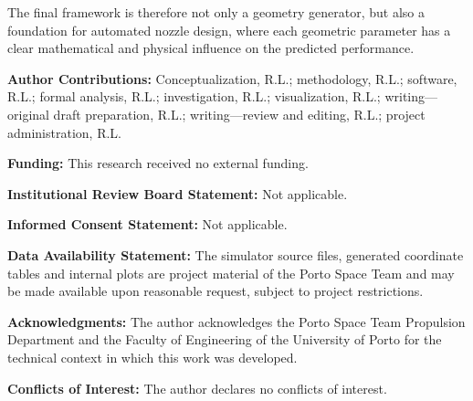 \documentclass[journal,article,submit,oneauthor]{Definitions/mdpi}
\begin{document}
The final framework is therefore not only a geometry generator, but also a foundation for automated nozzle design, where each geometric parameter has a clear mathematical and physical influence on the predicted performance.





\newpage

\noindent\textbf{Author Contributions:} Conceptualization, R.L.; methodology, R.L.; software, R.L.; formal analysis, R.L.; investigation, R.L.; visualization, R.L.; writing---original draft preparation, R.L.; writing---review and editing, R.L.; project administration, R.L.


\noindent\textbf{Funding:} This research received no external funding.


\noindent\textbf{Institutional Review Board Statement:} Not applicable.


\noindent\textbf{Informed Consent Statement:} Not applicable.


\noindent\textbf{Data Availability Statement:} The simulator source files, generated coordinate tables and internal plots are project material of the Porto Space Team and may be made available upon reasonable request, subject to project restrictions.


\noindent\textbf{Acknowledgments:} The author acknowledges the Porto Space Team Propulsion Department and the Faculty of Engineering of the University of Porto for the technical context in which this work was developed.


\noindent\textbf{Conflicts of Interest:} The author declares no conflicts of interest.


\end{document}
